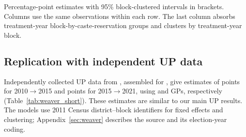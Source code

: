 \begin{table}[!htbp]
    \centering
    \caption{Sensitivity to Block Definitions and Caste Reservation}
    \label{tab:allocation_checks}
    \small
    
    \par\smallskip
    \begin{minipage}{\textwidth}\footnotesize
    Percentage-point estimates with 95\% block-clustered intervals in brackets. Columns use the same observations within each row. The last column absorbs treatment-year block-by-caste-reservation groups and clusters by treatment-year block.
    \end{minipage}
\end{table}
\FloatBarrier

\subsection{Replication with independent UP data}

Independently collected UP data from \citet{weaver_data}, assembled for \citet{narasimhan2024polity}, give estimates of \weaverShortOne{} points for 2010$\rightarrow$2015 and \weaverShortTwo{} points for 2015$\rightarrow$2021, using \weaverShortOneN{} and \weaverShortTwoN{} GPs, respectively (Table~\ref{tab:weaver_short}). These estimates are similar to our main UP results. The models use 2011 Census district--block identifiers for fixed effects and clustering; Appendix~\ref{sec:weaver} describes the source and its election-year coding.


\FloatBarrier
